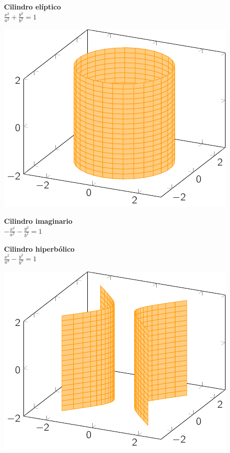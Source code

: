 \begin{minipage}[c]{0.45\textwidth}
  {\bf Cilindro elíptico}\vspace{1em}\\
  $\displaystyle \frac{{x}^2}{a^2} + \frac{{y}^2}{b^2}=1$
\end{minipage}\hfill
\begin{minipage}[]{0.45\textwidth}
\includegraphics{./img/celi.pdf}
\end{minipage}

\begin{minipage}[c]{0.45\textwidth}
  {\bf Cilindro imaginario}\vspace{1em}\\
  $\displaystyle -\frac{{x}^2}{a^2} - \frac{{y}^2}{b^2}=1$
\end{minipage}\hfill
\begin{minipage}[]{0.45\textwidth}
\hfill
\end{minipage}

\begin{minipage}[c]{0.45\textwidth}
  {\bf Cilindro hiperbólico}\vspace{1em}\\
  $\displaystyle \frac{{x}^2}{a^2} - \frac{{y}^2}{b^2}=1$
\end{minipage}\hfill
\begin{minipage}[]{0.45\textwidth}
\includegraphics{./img/chip.pdf}
\end{minipage}


